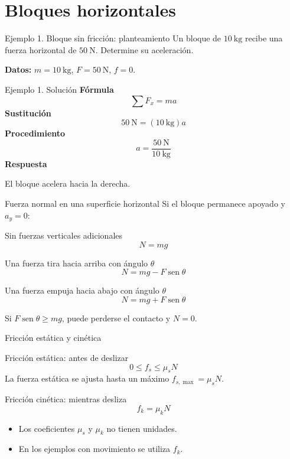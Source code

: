 \documentclass[aspectratio=169,11pt]{beamer}
\newcommand{\res}[1]{\begin{center}\setlength{\fboxsep}{8pt}\fcolorbox{morado}{morado!5}{\color{morado}\bfseries\ensuremath{#1}}\end{center}}
\newcommand{\dato}[1]{\textbf{Datos:} #1}
\begin{document}
\section{Bloques horizontales}
\begin{frame}{Ejemplo 1. Bloque sin fricción: planteamiento}
Un bloque de \(10\ \mathrm{kg}\) recibe una fuerza horizontal de \(50\ \mathrm{N}\). Determine su aceleración.
\begin{center}
\end{center}
\dato{\(m=10\ \mathrm{kg}\), \(F=50\ \mathrm{N}\), \(f=0\).}
\end{frame}
\begin{frame}{Ejemplo 1. Solución}
\textbf{Fórmula}
\[\sum F_x=ma\]
\textbf{Sustitución}
\[50\ \mathrm{N}=(10\ \mathrm{kg})a\]
\textbf{Procedimiento}
\[a=\frac{50\ \mathrm{N}}{10\ \mathrm{kg}}\]
\textbf{Respuesta}
\res{a=5\ \mathrm{m/s^2}}
El bloque acelera hacia la derecha.
\end{frame}
\begin{frame}{Fuerza normal en una superficie horizontal}
Si el bloque permanece apoyado y \(a_y=0\):
\begin{block}{Sin fuerzas verticales adicionales}
\[\boxed{N=mg}\]
\end{block}
\begin{block}{Una fuerza tira hacia arriba con ángulo \(\theta\)}
\[\boxed{N=mg-F\operatorname{sen}\theta}\]
\end{block}
\begin{block}{Una fuerza empuja hacia abajo con ángulo \(\theta\)}
\[\boxed{N=mg+F\operatorname{sen}\theta}\]
\end{block}
Si \(F\operatorname{sen}\theta\ge mg\), puede perderse el contacto y \(N=0\).
\end{frame}
\begin{frame}{Fricción estática y cinética}
\begin{block}{Fricción estática: antes de deslizar}
\[\boxed{0\le f_s\le \mu_sN}\]
La fuerza estática se ajusta hasta un máximo \(f_{s,\max}=\mu_sN\).
\end{block}
\begin{block}{Fricción cinética: mientras desliza}
\[\boxed{f_k=\mu_kN}\]
\end{block}
\begin{itemize}
\item Los coeficientes \(\mu_s\) y \(\mu_k\) no tienen unidades.
\item En los ejemplos con movimiento se utiliza \(f_k\).
\end{itemize}
\end{frame}
\end{document}
